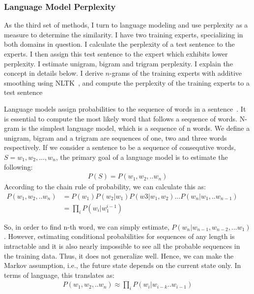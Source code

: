 \subsubsection{Language Model Perplexity} 

As the third set of methods, I turn to language modeling and use perplexity as a measure to determine the similarity. I have two training experts, specializing in both domains in question. I calculate the perplexity of a test sentence to the experts. I then assign this test sentence to the expert which exhibits lower perplexity. I estimate unigram, bigram and trigram perplexity. I explain the concept in details below. I derive $n$-grams  of the training experts with additive smoothing using NLTK~\citep{loper2002nltk}, and compute the perplexity of the training experts to a test sentence

Language models assign probabilities to the sequence of words in a sentence~\citep{jurafsky2014speech}. It is essential to compute the most likely word that follows a sequence of words. N-gram is the simplest language model, which is a sequence of n words. We define a unigram, bigram and a trigram are sequences of one, two and three words respectively. If we consider a sentence to be a sequence of consequtive words,  $S = {w_1,w_2,...,w_n}$, the primary goal of a language model is to estimate the following:
\begin{align}
    P(S) = P(w_1,w_2,..w_n)
\end{align}
According to the chain rule of probability, we can calculate this as:
\begin{equation}
    \begin{aligned}
        P(w_1,w_2,..w_n) &= P(w_1)P(w_2|w_1)P(w3|w_1,w_2) ... P(w_n|w_1,..w_{n-1})&&\\
     &= \prod_i P(w_i|w_{1}^{i-1})&&
    \end{aligned}
\end{equation}

So, in order to find n-th word, we can simply estimate, $P(w_n|w_{n-1}, w_{n-2}, ... w_1)$. However, estimating conditional probabilities for sequences of any length is intractable and it is also nearly impossible to see all the probable sequences in the training data. Thus, it does not generalize well. Hence, we can make the Markov assumption, i.e., the future state depends on the current state only. In terms of language, this translates as:
\begin{align}
    P(w_1,w_2,..w_n) \approx \prod_i P(w_i|w_{i-k}..w_{i-1})
\end{align}

